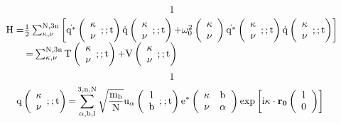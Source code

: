 \documentclass{article}
\begin{document}
\[1\] 
\[ \begin{array}{l}
{\rm H=}\frac{{\rm 1}}{{\rm 2}}\sum^{{\rm N,3n}}_{{\mathbf \kappa }{\rm ,}\nu }{\left[\dot{{{\rm q}}^{{\rm *}}}\left( \begin{array}{c}
{\mathbf \kappa } \\ 
\nu  \end{array}
;;{\rm t}\right)\dot{{\rm q}}\left( \begin{array}{c}
{\mathbf \kappa } \\ 
\nu  \end{array}
;;{\rm t}\right){\rm +}{\omega }^{{\rm 2}}_0\left( \begin{array}{c}
{\mathbf \kappa } \\ 
\nu  \end{array}
\right)\dot{{{\rm q}}^{{\rm *}}}\left( \begin{array}{c}
{\mathbf \kappa } \\ 
\nu  \end{array}
;;{\rm t}\right)\dot{{\rm q}}\left( \begin{array}{c}
{\mathbf \kappa } \\ 
\nu  \end{array}
;;{\rm t}\right)\right]} \\ 
{\rm \ \ \ \ \ \ =}\sum^{{\rm N,3n}}_{{\mathbf \kappa }{\rm ,}\nu }{{\rm T}\left( \begin{array}{c}
{\mathbf \kappa } \\ 
\nu  \end{array}
;;{\rm t}\right){\rm +V}\left( \begin{array}{c}
{\mathbf \kappa } \\ 
\nu  \end{array}
;;{\rm t}\right)} \end{array}
\] 
\[1\] 
\[{\rm q}\left( \begin{array}{c}
{\mathbf \kappa } \\ 
\nu  \end{array}
;;{\rm t}\right){\rm =}\sum^{{\rm 3,n,N}}_{\alpha {\rm ,b,l}}{\sqrt{\frac{{{\rm m}}_{{\rm b}}}{{\rm N}}}}{{\rm u}}_{\alpha }\left( \begin{array}{c}
{\rm l} \\ 
{\rm b} \end{array}
;;{\rm t}\right){{\rm e}}^{{\rm *}}\left( \begin{array}{cc}
{\mathbf \kappa } & {\rm b} \\ 
\nu  & \alpha  \end{array}
\right){\exp  \left[{\rm i}{\mathbf \kappa }\cdot {{\mathbf r}}_{{\mathbf 0}}\left( \begin{array}{c}
{\rm l} \\ 
0 \end{array}
\right)\right]\ }\] 
\end{document}
